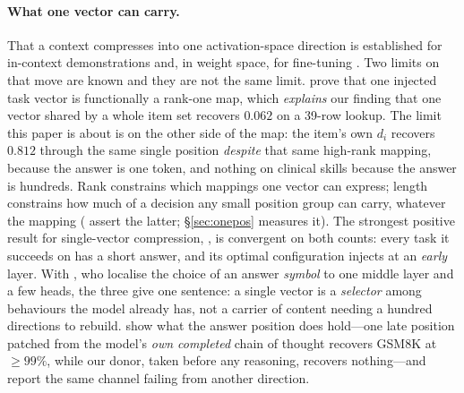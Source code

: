 \documentclass{article}
\newcommand{\dvec}{\ensuremath{d}}
\begin{document}
\paragraph{What one vector can carry.} That a context compresses into one
activation-space direction is established for in-context demonstrations
\citep{hendel2023taskvectors, todd2024functionvectors} and, in weight space, for
fine-tuning \citep{ilharco2023taskarithmetic}. Two limits on that move are
known and they are not the same limit. \citet{dong2026taskvectorlimits} prove
that one injected task vector is functionally a rank-one map, which
\emph{explains} our finding that one vector shared by a whole item set recovers
$0.062$ on a 39-row lookup. The limit this paper is about is on the other side
of the map: the item's own $\dvec_i$ recovers $0.812$ through the same single
position \emph{despite} that same high-rank mapping, because the answer is one
token, and nothing on clinical skills because the answer is hundreds. Rank
constrains which mappings one vector can express; length constrains how much of
a decision any small position group can carry, whatever the mapping
(\citealp{dura2026sequentialpatching} assert the latter; \S\ref{sec:onepos}
measures it). The strongest positive result for single-vector compression,
\citet{ardoin2026promptcompression}, is convergent on both counts: every task it
succeeds on has a short answer, and its optimal configuration injects at an
\emph{early} layer. With \citet{wiegreffe2025mcq}, who localise the choice of an
answer \emph{symbol} to one middle layer and a few heads, the three give one
sentence: a single vector is a \emph{selector} among behaviours the model
already has, not a carrier of content needing a hundred directions to rebuild.
\citet{mehrafarin2026cothidden} show what the answer position does hold---one
late position patched from the model's \emph{own completed} chain of thought
recovers GSM8K at $\ge99\%$, while our donor, taken before any reasoning,
recovers nothing---and \citet{dasilva2025steeringoff} report the same channel
failing from another direction.
\end{document}
